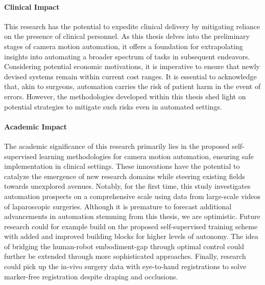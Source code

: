 \paragraph{Clinical Impact} This research has the potential to expedite clinical delivery by mitigating reliance on the presence of clinical personnel. As this thesis delves into the preliminary stages of camera motion automation, it offers a foundation for extrapolating insights into automating a broader spectrum of tasks in subsequent endeavors. Considering potential economic motivations, it is imperative to ensure that newly devised systems remain within current cost ranges. It is essential to acknowledge that, akin to surgeons, automation carries the risk of patient harm in the event of errors. However, the methodologies developed within this thesis shed light on potential strategies to mitigate such risks even in automated settings.

\paragraph{Academic Impact} The academic significance of this research primarily lies in the proposed self-supervised learning methodologies for camera motion automation, ensuring safe implementation in clinical settings. These innovations have the potential to catalyze the emergence of new research domains while steering existing fields towards unexplored avenues. Notably, for the first time, this study investigates automation prospects on a comprehensive scale using data from large-scale videos of laparoscopic surgeries. Although it is premature to forecast additional advancements in automation stemming from this thesis, we are optimistic. Future research could for example build on the proposed self-supervised training scheme with added and improved building blocks for higher levels of autonomy. The idea of bridging the human-robot embodiment-gap through optimal control could further be extended through more sophisticated approaches. Finally, research could pick up the in-vivo surgery data with eye-to-hand registrations to solve marker-free registration despite draping and occlusions.


